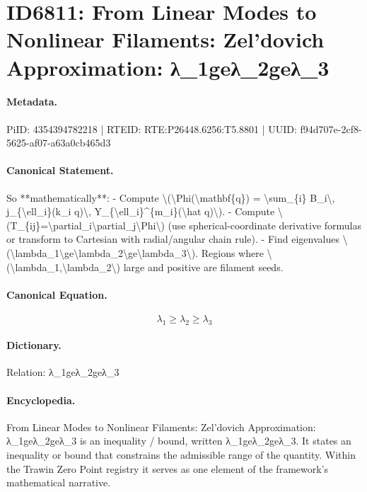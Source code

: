 \section*{ID6811: From Linear Modes to Nonlinear Filaments: Zel’dovich Approximation: λ\_1geλ\_2geλ\_3}
\paragraph{Metadata.}
PiID: 4354394782218 | RTEID: RTE:P26448.6256:T5.8801 | UUID: f94d707e-2cf8-5625-af07-a63a0cb465d3

\paragraph{Canonical Statement.}
So **mathematically**: - Compute \textbackslash{}(\textbackslash{}Phi(\textbackslash{}mathbf\{q\}) = \textbackslash{}sum\_\{i\} B\_i\textbackslash{}, j\_\{\textbackslash{}ell\_i\}(k\_i q)\textbackslash{}, Y\_\{\textbackslash{}ell\_i\}\textasciicircum{}\{m\_i\}(\textbackslash{}hat q)\textbackslash{}). - Compute \textbackslash{}(T\_\{ij\}=\textbackslash{}partial\_i\textbackslash{}partial\_j\textbackslash{}Phi\textbackslash{}) (use spherical-coordinate derivative formulas or transform to Cartesian with radial/angular chain rule). - Find eigenvalues \textbackslash{}(\textbackslash{}lambda\_1\textbackslash{}ge\textbackslash{}lambda\_2\textbackslash{}ge\textbackslash{}lambda\_3\textbackslash{}). Regions where \textbackslash{}(\textbackslash{}lambda\_1,\textbackslash{}lambda\_2\textbackslash{}) large and positive are filament seeds.

\paragraph{Canonical Equation.}
\[
\lambda_1\ge\lambda_2\ge\lambda_3
\]

\paragraph{Dictionary.}
Relation: λ\_1geλ\_2geλ\_3

\paragraph{Encyclopedia.}
From Linear Modes to Nonlinear Filaments: Zel’dovich Approximation: λ\_1geλ\_2geλ\_3 is an inequality / bound, written λ\_1geλ\_2geλ\_3. It states an inequality or bound that constrains the admissible range of the quantity. Within the Trawin Zero Point registry it serves as one element of the framework's mathematical narrative.
